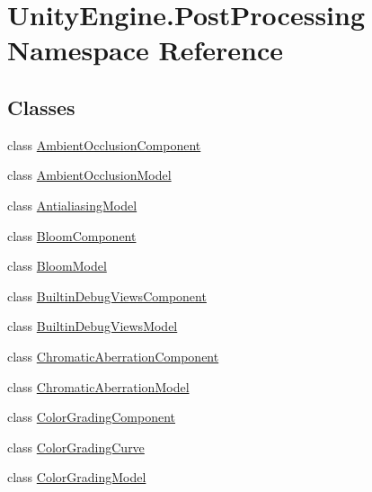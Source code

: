 \hypertarget{namespace_unity_engine_1_1_post_processing}{}\section{Unity\+Engine.\+Post\+Processing Namespace Reference}
\label{namespace_unity_engine_1_1_post_processing}
\subsection*{Classes}
\begin{DoxyCompactItemize}
\item 
class \mbox{\hyperlink{class_unity_engine_1_1_post_processing_1_1_ambient_occlusion_component}{Ambient\+Occlusion\+Component}}
\item 
class \mbox{\hyperlink{class_unity_engine_1_1_post_processing_1_1_ambient_occlusion_model}{Ambient\+Occlusion\+Model}}
\item 
class \mbox{\hyperlink{class_unity_engine_1_1_post_processing_1_1_antialiasing_model}{Antialiasing\+Model}}
\item 
class \mbox{\hyperlink{class_unity_engine_1_1_post_processing_1_1_bloom_component}{Bloom\+Component}}
\item 
class \mbox{\hyperlink{class_unity_engine_1_1_post_processing_1_1_bloom_model}{Bloom\+Model}}
\item 
class \mbox{\hyperlink{class_unity_engine_1_1_post_processing_1_1_builtin_debug_views_component}{Builtin\+Debug\+Views\+Component}}
\item 
class \mbox{\hyperlink{class_unity_engine_1_1_post_processing_1_1_builtin_debug_views_model}{Builtin\+Debug\+Views\+Model}}
\item 
class \mbox{\hyperlink{class_unity_engine_1_1_post_processing_1_1_chromatic_aberration_component}{Chromatic\+Aberration\+Component}}
\item 
class \mbox{\hyperlink{class_unity_engine_1_1_post_processing_1_1_chromatic_aberration_model}{Chromatic\+Aberration\+Model}}
\item 
class \mbox{\hyperlink{class_unity_engine_1_1_post_processing_1_1_color_grading_component}{Color\+Grading\+Component}}
\item 
class \mbox{\hyperlink{class_unity_engine_1_1_post_processing_1_1_color_grading_curve}{Color\+Grading\+Curve}}
\item 
class \mbox{\hyperlink{class_unity_engine_1_1_post_processing_1_1_color_grading_model}{Color\+Grading\+Model}}

\end{DoxyCompactItemize}
